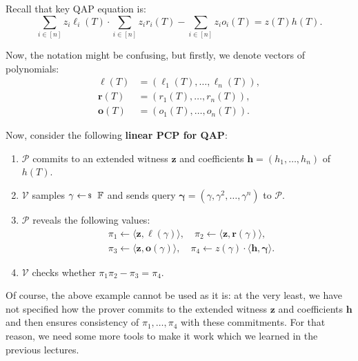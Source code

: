 \documentclass[../../book.tex]{subfiles}
\begin{document}
\begin{example}
    Recall that key QAP equation is:
    \begin{equation*}
        \sum_{i \in [n]}z_i\ell_i(T) \cdot \sum_{i \in [n]}z_ir_i(T) - \sum_{i \in [n]}z_io_i(T) = z(T)h(T).
    \end{equation*}

    Now, the notation might be confusing, but firstly, we denote vectors of polynomials: 
    \begin{align*}
        \boldsymbol{\ell}(T) & = (\ell_1(T),\dots,\ell_n(T)), \\
        \boldsymbol{r}(T) & = (r_1(T),\dots,r_n(T)), \\
        \boldsymbol{o}(T) & = (o_1(T),\dots,o_n(T)).
    \end{align*}
    
    Now, consider the following \textbf{linear PCP for QAP}:
    \begin{enumerate}
        \item $\mathcal{P}$ commits to an extended witness $\mathbf{z}$ and
        coefficients $\mathbf{h} = (h_1,\dots,h_n)$ of $h(T)$.
        \item $\mathcal{V}$ samples $\gamma \leftarrowS \mathbb{F}$ and sends
        query $\boldsymbol{\gamma} = (\gamma,\gamma^2,\dots,\gamma^n)$ to
        $\mathcal{P}$.
        \item $\mathcal{P}$ reveals the following values:
        \begin{equation*}
            \begin{aligned}
                &\pi_1 \gets \langle \mathbf{z}, \boldsymbol{\ell}(\gamma) \rangle, \quad \pi_2 \gets \langle \mathbf{z}, \boldsymbol{r}(\gamma) \rangle, \\
                &\pi_3 \gets \langle \mathbf{z}, \boldsymbol{o}(\gamma) \rangle, \quad \pi_4 \gets z(\gamma) \cdot \langle \mathbf{h}, \boldsymbol{\gamma} \rangle.                
            \end{aligned}
        \end{equation*}
        \item $\mathcal{V}$ checks whether $\pi_1\pi_2 - \pi_3 = \pi_4$.
    \end{enumerate}
\end{example}

Of course, the above example cannot be used as it is: at the very least, we have not specified how the prover commits to the extended witness $\mathbf{z}$ and coefficients $\mathbf{h}$ and then ensures consistency of $\pi_1,\dots,\pi_4$ with these commitments. For that reason, we need some more tools to make it work which we learned in the previous lectures.
\end{document}
